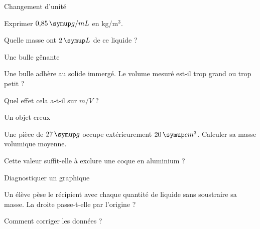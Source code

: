 \par\noindent\begin{minipage}{\linewidth}
\begin{exercice}[2]{Changement d’unité}
\begin{questions}
\item Exprimer $0{,}85\unite{g/mL}$ en kg/m$^3$.
\item Quelle masse ont $2\unite L$ de ce liquide ?
\end{questions}
\end{exercice}
\end{minipage}
\clearpage{}
\par\noindent\begin{minipage}{\linewidth}
\begin{exercice}[3]{Une bulle gênante}
\begin{questions}
\item Une bulle adhère au solide immergé. Le volume mesuré est-il trop grand ou trop petit ?
\item Quel effet cela a-t-il sur $m/V$ ?
\end{questions}
\end{exercice}
\end{minipage}
\par\noindent\begin{minipage}{\linewidth}
\begin{exercice}[3]{Un objet creux}
\begin{questions}
\item Une pièce de $27\unite g$ occupe extérieurement $20\unite{cm^3}$. Calculer sa masse volumique moyenne.
\item Cette valeur suffit-elle à exclure une coque en aluminium ?
\end{questions}
\end{exercice}
\end{minipage}
\par\noindent\begin{minipage}{\linewidth}
\begin{exercice}[3]{Diagnostiquer un graphique}
\begin{questions}
\item Un élève pèse le récipient avec chaque quantité de liquide sans soustraire sa masse. La droite passe-t-elle par l’origine ?
\item Comment corriger les données ?
\end{questions}
\end{exercice}
\end{minipage}
